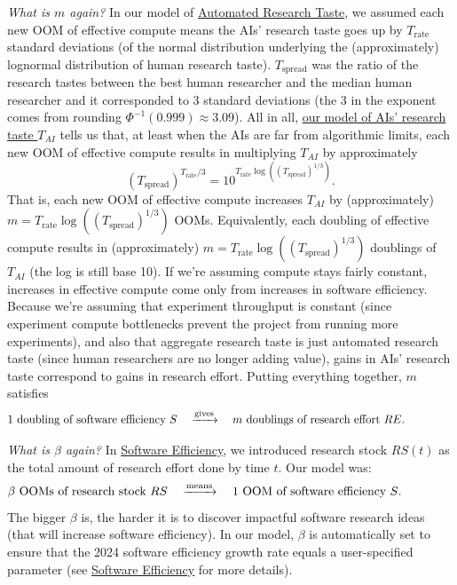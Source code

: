 \documentclass{article}
\theoremstyle{definition}
\begin{document}
\textit{What is $m$ again?} In our model of \hyperref[Automated research taste]{Automated Research Taste}, we assumed each new OOM of effective compute means the AIs' research taste goes up by $T_\text{rate}$ standard deviations (of the normal distribution underlying the (approximately) lognormal distribution of human research taste). $T_\text{spread}$ was the ratio of the research tastes between the best human researcher and the median human researcher and it corresponded to 3 standard deviations (the 3 in the exponent comes from rounding $\Phi^{-1}(0.999) \approx 3.09$). All in all, \hyperref[Automated research taste]{our model of AIs' research taste $T_{AI}$} tells us that, at least when the AIs are far from algorithmic limits, each new OOM of effective compute results in multiplying $T_{AI}$ by approximately
\[ \left(T_\text{spread}\right)^{T_\text{rate}/3} = 10^{T_\text{rate} \log\left(\left(T_\text{spread}\right)^{1/3}\right)}.\]
That is, each new OOM of effective compute increases $T_{AI}$ by (approximately) $m = T_\text{rate} \log\left(\left(T_\text{spread}\right)^{1/3}\right)$ OOMs. Equivalently, each doubling of effective compute results in (approximately) $m = T_\text{rate} \log\left(\left(T_\text{spread}\right)^{1/3}\right)$ doublings of $T_{AI}$ (the log is still base 10). If we're assuming compute stays fairly constant, increases in effective compute come only from increases in software efficiency. Because we're assuming that experiment throughput is constant (since experiment compute bottlenecks prevent the project from running more experiments), and also that aggregate research taste is just automated research taste (since human researchers are no longer adding value), gains in AIs' research taste correspond to gains in research effort. Putting everything together, $m$ satisfies
\begin{equation} \label{m}
\text{1 doubling of software efficiency $S$} \quad \xrightarrow{\text{gives}} \quad \text{$m$ doublings of research effort $RE$}. \hspace*{1.5cm}
\end{equation}

\textit{What is $\beta$ again?} In \hyperref[Software efficiency]{Software Efficiency}, we introduced research stock $RS(t)$ as the total amount of research effort done by time $t$. Our model was:
\begin{equation} \label{RS to S}
\text{$\beta$ OOMs of research stock $RS$} \quad \xrightarrow{\text{means}} \quad \text{1 OOM of software efficiency $S$}. \hspace*{1.5cm}
\end{equation}
The bigger $\beta$ is, the harder it is to discover impactful software research ideas (that will increase software efficiency). In our model, $\beta$ is automatically set to ensure that the 2024 software efficiency growth rate equals a user-specified parameter (see \hyperref[Software efficiency]{Software Efficiency} for more details).
\end{document}
